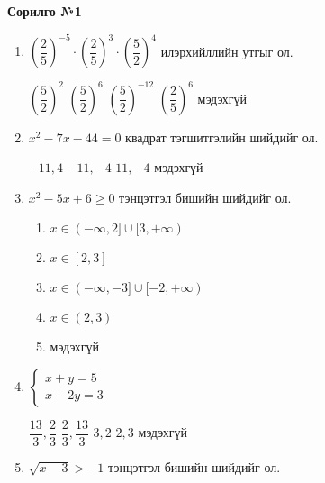 \documentclass{exam}
\begin{document}
\begin{center}
    {\bf Сорилго №1}
\end{center}
\begin{enumerate}

\item $\left(\dfrac{2}{5}\right)^{-5}\cdot \left(\dfrac{2}{5}\right)^{3}\cdot\left(\dfrac{5}{2}\right)^4$ илэрхийллийн утгыг ол. 

 \begin{oneparchoices}
 
\choice $\left(\dfrac{5}{2}\right)^{2}$
\choice $\left(\dfrac{5}{2}\right)^{6}$ 
\choice $\left(\dfrac{5}{2}\right)^{-12}$ 
\choice $\left(\dfrac{2}{5}\right)^{6}$
\choice мэдэхгүй

\end{oneparchoices} 

\item  $x^2-7x-44=0$ квадрат тэгшитгэлийн шийдийг ол. 

\begin{oneparchoices}
    \choice $-11,4$
\choice $-11,-4$
\choice $11,-4$ 
\choice мэдэхгүй
\end{oneparchoices}

    \item $x^2-5x+6\geq0$ тэнцэтгэл бишийн шийдийг ол. 
    
\begin{enumerate}
        \item [A.] $x\in(-\infty, 2]\cup[3,+\infty)$
        \item [B.] $x\in[2,3]$
        \item [C.] $x\in(-\infty, -3]\cup[-2,+\infty)$
        \item [D.] $x\in(2,3)$
        \item [E.] мэдэхгүй
\end{enumerate}


 \item 
 $\begin{cases} x+y=5  \\ x-2y=3 \end{cases}$

 \begin{oneparchoices}
\choice $\dfrac{13}{3},\dfrac{2}{3}$
\choice $\dfrac{2}{3},\dfrac{13}{3}$ 
\choice $3,2$
\choice $2,3$
\choice мэдэхгүй
\end{oneparchoices}

\item $\sqrt{x-3}>-1$ тэнцэтгэл бишийн шийдийг ол.


\end{enumerate}
\end{document}
